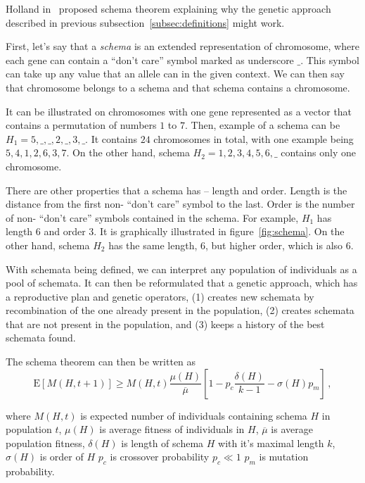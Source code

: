 Holland in~\cite{hollandAdaptationNaturalArtificial1975} proposed
schema theorem explaining why the genetic approach described in
previous subsection~\ref{subsec:definitions} might work.

First, let’s say that a \textit{schema} is an extended representation of chromosome,
where each gene can contain a “don’t care” symbol marked as underscore $\_$.
This symbol can take up any value that an allele can in the given context.
We can then say that chromosome belongs to a schema
and that schema contains a chromosome.

It can be illustrated on chromosomes with one gene represented as
a vector that contains a permutation of numbers $1$ to $7$.
Then, example of a schema can be $H_1 = 5, \_, \_, 2, \_, 3, \_$.
It contains $24$ chromosomes in total, with one example being $5, 4, 1, 2, 6, 3, 7$.
On the other hand, schema $H_2 = 1, 2, 3, 4, 5, 6, \_$ contains only one chromosome.

There are other properties that a schema has – length and order.
Length is the distance from the first non- “don’t care” symbol to the last.
Order is the number of non- “don’t care” symbols contained in the schema.
For example, $H_1$ has length $6$ and order $3$.
It is graphically illustrated in figure~\ref{fig:schema}.
On the other hand, schema $H_2$ has the same length, $6$, but higher order, which is also $6$.

With schemata being defined, we can interpret any population of individuals as a pool of schemata.
It can then be reformulated that a genetic approach, which has a reproductive plan and
genetic operators, (1) creates new schemata by recombination of the one already present in the population,
(2) creates schemata that are not present in the population, and (3) keeps a history of the best schemata found.

The schema theorem can then be written as
\begin{equation}
    \mathrm{E}[M(H, t+1)] \geq M(H, t) \dfrac{\mu(H)}{\overline{\mu}}\left[ 1 - p_c \dfrac{\delta(H)}{k-1} - \sigma(H)
    p_m \right]\,,
    \label{eq:schema-theorem}
\end{equation}

where $M(H, t)$ is expected number of individuals containing schema $H$ in population $t$,
$\mu(H)$ is average fitness of individuals in $H$,
$\overline{\mu}$ is average population fitness,
$\delta(H)$ is length of schema $H$ with it’s maximal length $k$,
$\sigma(H)$ is order of $H$
$p_c$ is crossover probability $p_c \ll 1$
$p_m$ is mutation probability.

